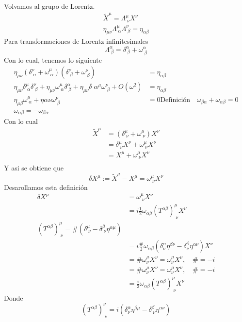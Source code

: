 \documentclass[../main.tex]{subfiles}
\begin{document}
Volvamos al grupo de Lorentz. 
\begin{align*}
  \tilde{X}^\mu  = \Lambda_{\;\nu}^\mu X^\nu \\
  \eta_{\mu \nu}\Lambda_{\; \alpha}^\mu \Lambda_{\; \beta}^\nu = \eta_{\alpha \beta}
\end{align*}
Para transformaciones de Lorentz infinitesimales 
\begin{equation*}
  \Lambda_{\;\beta}^\alpha = \delta_{\; \beta}^\alpha + \omega_{\; \beta}^{\alpha}
\end{equation*}
Con lo cual, tenemos lo siguiente
\begin{align*}
  \eta_{\mu \nu} \left(\delta_{\; \alpha}^\nu + \omega_{\; \alpha}^\mu\right)\left( \delta_{\;\beta}^\nu + \omega_{\;\beta}^\nu \right) & = \eta_{\alpha \beta} \\
  \eta_{\mu \nu} \delta_{\; \alpha}^\mu \delta_{\; \beta}^\nu + \eta_{\mu \nu} \omega^\mu_{\; \alpha} \delta_{\; \beta}^\alpha + \eta_{\mu \nu}\delta{\;\alpha}^\mu \omega^\nu_{\; \beta} + O(\omega^2) & = \eta_{\alpha \beta} \\
  \eta_{\mu \beta}\omega_{\; \alpha}^\mu + \eta{\alpha \nu}\omega^\nu_{\; \beta} & = 0
  \text{Definición} \quad \omega_{\beta \alpha} + \omega_{\alpha \beta} = 0 \\
  \boxed{\omega_{\alpha \beta} = -\omega_{\beta \alpha}}
\end{align*}
Con lo cual
\begin{align*}
  \tilde{X}^\mu &  =\left(\delta_{\; \nu}^\mu + \omega^\mu_{\; \nu}\right)X^\nu \\
   & = \delta_{\; \nu}^\mu X^\nu + \omega^\mu_{\; \nu} X^\nu \\
   & = X^\mu + \omega^\mu_{\; \nu}X^\nu \\
\end{align*}
Y asi se obtiene que
\begin{equation*}
  \delta X^\mu := \tilde{X}^\mu - X^\mu = \omega^\mu_{\;\nu}X^\nu
\end{equation*}
Desarollamos esta definición
\begin{align*}
  \delta X^\mu & = \omega_{\; \nu}^\mu X^\nu \\
  & = i\frac{1}{2}\omega_{\alpha \beta}\left(T^{\alpha \beta}\right)^\mu_{\; \nu}X^\nu \\
  \left(T^{\alpha \beta}\right)^\mu_{\; \nu} = \#\left(\delta_{\; \nu}^\mu - \delta^\beta_{\; \nu}\eta^{\alpha \mu}\right) \\
  & = i\frac{\#}{2}\omega_{\alpha\beta} \left(\delta_{\nu}^{\alpha}\eta^{\beta \nu} - \delta_{\nu}^\beta\eta^{\alpha \nu}\right)X^\nu \\
  & = \#\omega^\mu_\nu X^\nu = \omega^\mu_\nu X^\nu , \quad \#=-i \\
  & = \# \omega^\mu_\nu X^\nu = \omega^\mu_\nu X^\nu , \quad \#=-i \\
  & = \frac{i}{2}\omega_{\alpha \beta} \left(T^{\alpha \beta}\right)^{\mu}_{\; \nu}X^\nu 
\end{align*}
Donde 
\begin{equation*}
  \left(T^{\alpha\beta}\right)^\nu_{\; \nu} = i \left(\delta^\alpha_\nu \eta^{\beta \mu} - \delta^\beta_{\; \nu}\eta^{\alpha \nu}\right)
\end{equation*}
\end{document}
